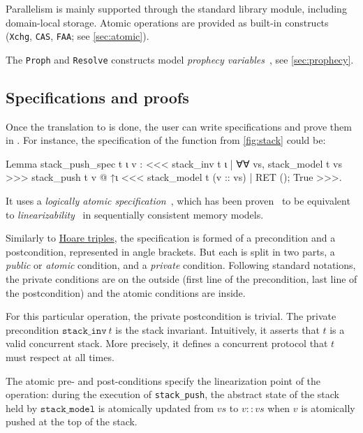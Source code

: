 Parallelism is mainly supported through the  standard library module, including domain-local storage. Atomic operations are provided as built-in constructs (\texttt{Xchg}, \texttt{CAS}, \texttt{FAA}; see \cref{sec:atomic}).

The \texttt{Proph} and \texttt{Resolve} constructs model \emph{prophecy variables}~\citep{DBLP:journals/pacmpl/JungLPRTDJ20}, see \cref{sec:prophecy}.

\subsection{Specifications and proofs}
\label{subsec:stack-specs-and-proofs}

Once the translation to \ZooLang is done, the user can write specifications and prove them in \Iris.
For instance, the specification of the  function from \cref{fig:stack} could be:

\begin{coqcode}
Lemma stack_push_spec t ι v :
  <<< stack_inv t ι
    | ∀∀ vs, stack_model t vs >>>
    stack_push t v @ ↑ι
  <<< stack_model t (v :: vs)
    | RET (); True >>>.
\end{coqcode}

It uses a \emph{logically atomic specification}~\citep{DBLP:conf/ecoop/PintoDG14}, which has been proven~\citep{DBLP:journals/pacmpl/BirkedalDGJST21} to be equivalent to \emph{linearizability}~\citep{DBLP:journals/toplas/HerlihyW90} in sequentially consistent memory models.

Similarly to \href{https://en.wikipedia.org/wiki/Hoare_logic}{Hoare triples},
the specification is formed of a precondition and a postcondition, represented in angle brackets.
But each is split in two parts, a \emph{public} or \emph{atomic} condition, and a \emph{private} condition.
Following standard \Iris notations, the private conditions are on the outside (first line of the precondition, last line of the postcondition) and the atomic conditions are inside.

For this particular operation, the private postcondition is trivial.
The private precondition $\mathtt{stack\_inv}\ t$ is the stack invariant.
Intuitively, it asserts that $t$ is a valid concurrent stack.
More precisely, it defines a concurrent protocol that $t$ must respect at all times.

The atomic pre- and post-conditions specify the linearization point of the operation: during the execution of \texttt{stack\_push}, the abstract state of the stack held by $\mathtt{stack\_model}$ is atomically updated from $\mathit{vs}$ to $\mathit{v} :: \mathit{vs}$ when $\mathit{v}$ is atomically pushed at the top of the stack.

